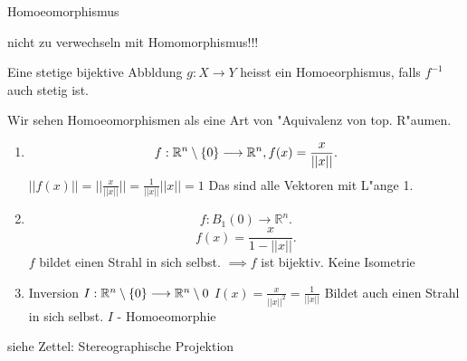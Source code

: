 \documentclass[class=article, crop=false]{standalone}
\begin{document}
\begin{zettel}{Homoeomorphismus}
\begin{flashcard}
    nicht zu verwechseln mit Homomorphismus!!!
\begin{definition}[Homoeomorphismus]
   Eine stetige bijektive Abbldung $g:X \longrightarrow Y$  heisst ein Homoeorphismus, falls $f^{-1} $  auch stetig ist.
   \begin{remark}
      Wir sehen Homoeomorphismen als eine Art von "Aquivalenz von top. R"aumen. 
   \end{remark}
\end{definition}

\begin{example}
    \begin{enumerate}
    \item \[
        f: \mathbb{R}^n \setminus \set{0} \longrightarrow  \mathbb{R}^n , f(x) =  \frac{x}{ ||x||}
    .\]
    $ ||f(x)|| = ||\frac{x}{||x||}|| = \frac{1}{ ||x||} ||x|| = 1 $ 
    Das sind alle Vektoren mit L"ange 1.
     \item \[
         f: B_1 (0) \longrightarrow \mathbb{R}^n
     .\]
     \[
         f(x) =  \frac{x}{1 - ||x||} 
     .\]
     $f$ bildet einen Strahl in sich selbst. $\implies f$ ist bijektiv. Keine Isometrie

     \item Inversion $I: \mathbb{R}^n \setminus \set{0} \longrightarrow  \R^n \setminus 0$  \quad $I(x) = \frac{x}{ ||x||^2 } = \frac{1}{ ||x||}  $ Bildet auch einen Strahl in sich selbst. $I$ - Homoeomorphie
    \end{enumerate}
\end{example}

\begin{example}
    siehe Zettel: Stereographische Projektion
\end{example}

\end{flashcard}
\end{zettel}
\end{document}

